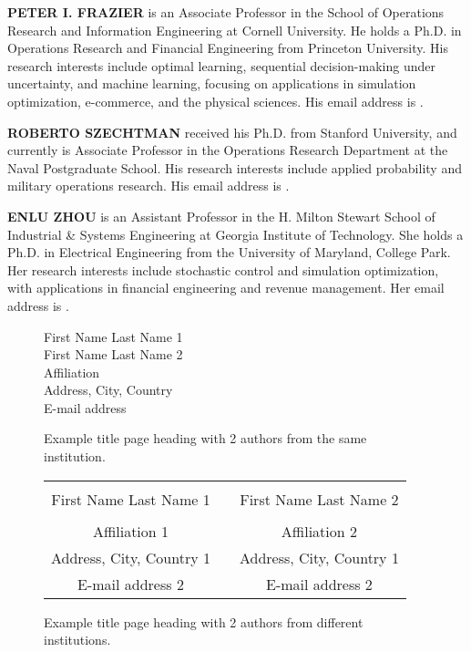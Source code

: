 \documentclass{scspaperproc}
\theoremstyle{scsthe}
\begin{document}
\textbf{\uppercase{PETER I. FRAZIER}} is an Associate Professor in the School of Operations Research and Information Engineering at Cornell University. He holds a Ph.D. in Operations Research and Financial Engineering from Princeton University. His research interests include optimal learning, sequential decision-making under uncertainty, and machine learning, focusing on applications in simulation optimization, e-commerce, and the physical sciences.  His email address is .

\textbf{\uppercase{ROBERTO SZECHTMAN}} received his Ph.D. from Stanford University, and currently is Associate Professor in the Operations Research Department at the Naval Postgraduate School. His research interests include applied probability and military operations research. His email address is .

\textbf{\uppercase{ENLU ZHOU}} is an Assistant Professor in the H. Milton Stewart School of Industrial \& Systems Engineering at Georgia Institute of Technology. She holds a Ph.D. in Electrical Engineering from the University of Maryland, College Park. Her research interests include stochastic control and simulation optimization, with applications in financial engineering and revenue management. Her email address is .

\newpage

\begin{figure*}[htb]
{
\centering
First Name Last Name 1 \\
First Name Last Name 2 \\
\vspace{12pt}
Affiliation \\
Address, City, Country \\
E-mail address
\caption{Example title page heading with 2 authors from the same institution.\label{fig2same}}
}
\end{figure*}

\begin{figure*}[htb]
{
\centering
\begin{tabular}{ccc}
\phantom{Entries to adjust spacing - ignore} & \phantom{intermediate space} & \phantom{Entries to adjust spacing - ignore} \\
First Name Last Name 1 & & First Name Last Name 2 \\
\\
Affiliation 1 & & Affiliation 2 \\
Address, City, Country 1 & & Address, City, Country 1 \\
E-mail address 2 & & E-mail address 2 
\end{tabular}
\caption{Example title page heading with 2 authors from different institutions.\label{fig2different}}
}
\end{figure*}
\end{document}
